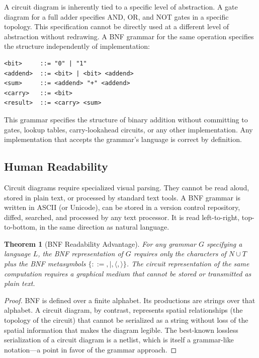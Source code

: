 \documentclass[12pt, a4paper, openany]{book}
\theoremstyle{plain}
\newtheorem{theorem}{Theorem}[chapter]
\theoremstyle{definition}
\theoremstyle{remark}
\begin{document}
A circuit diagram is inherently tied to a specific level of abstraction. A gate
diagram for a full adder specifies AND, OR, and NOT gates in a specific topology.
This specification cannot be directly used at a different level of abstraction
without redrawing. A BNF grammar for the same operation specifies the structure
independently of implementation:

\begin{lstlisting}[style=rust, caption={BNF for binary addition (implementation-independent)}]
<bit>     ::= "0" | "1"
<addend>  ::= <bit> | <bit> <addend>
<sum>     ::= <addend> "+" <addend>
<carry>   ::= <bit>
<result>  ::= <carry> <sum>
\end{lstlisting}

This grammar specifies the structure of binary addition without committing to
gates, lookup tables, carry-lookahead circuits, or any other implementation.
Any implementation that accepts the grammar's language is correct by definition.

\subsection{Human Readability}

Circuit diagrams require specialized visual parsing. They cannot be read aloud,
stored in plain text, or processed by standard text tools. A BNF grammar is
written in ASCII (or Unicode), can be stored in a version control repository,
diffed, searched, and processed by any text processor. It is read left-to-right,
top-to-bottom, in the same direction as natural language.

\begin{theorem}[BNF Readability Advantage]
For any grammar $G$ specifying a language $L$, the BNF representation of $G$
requires only the characters of $N \cup T$ plus the BNF metasymbols
$\{::=, |, \langle, \rangle\}$. The circuit representation of the same computation
requires a graphical medium that cannot be stored or transmitted as plain text.
\end{theorem}

\begin{proof}
BNF is defined over a finite alphabet. Its productions are strings over that
alphabet. A circuit diagram, by contrast, represents spatial relationships (the
topology of the circuit) that cannot be serialized as a string without loss of
the spatial information that makes the diagram legible. The best-known lossless
serialization of a circuit diagram is a netlist, which is itself a grammar-like
notation---a point in favor of the grammar approach.
\end{proof}
\end{document}

